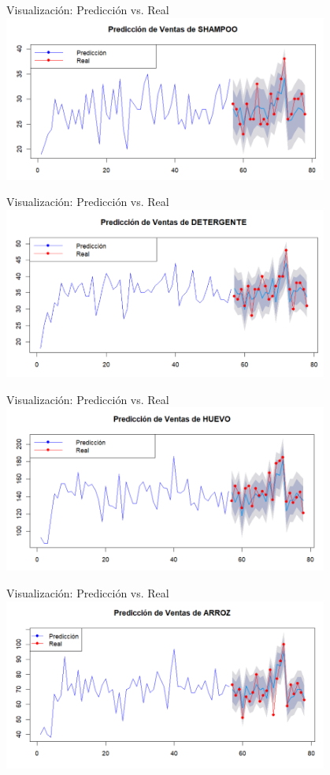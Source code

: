 \documentclass{beamer}
\begin{document}
\begin{frame}{Visualizaci\'on: Predicci\'on vs. Real}
\includegraphics[width=0.8\textwidth]{i1.png}
\end{frame}
\begin{frame}{Visualizaci\'on: Predicci\'on vs. Real}
\includegraphics[width=0.8\textwidth]{i2.png}
\end{frame}
\begin{frame}{Visualizaci\'on: Predicci\'on vs. Real}
\includegraphics[width=0.8\textwidth]{i3.png}
\end{frame}
\begin{frame}{Visualizaci\'on: Predicci\'on vs. Real}
\includegraphics[width=0.8\textwidth]{i4.png}
\end{frame}
\end{document}
